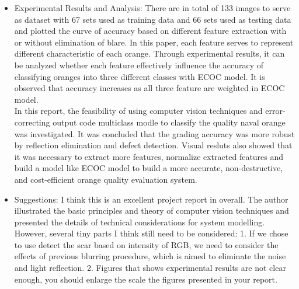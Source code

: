 \documentclass[letterpaper]{article}
\begin{document}
\begin{itemize}
	\item Experimental Results and Analysis: There are in total of 133 images to serve as dataset with 67 sets used as training data and 66 sets used as testing data and plotted the curve of accuracy based on different feature extraction with or without elimination of blare. In this paper, each feature serves to represent different characteristic of each orange. Through experimental results, it can be analyzed whether each feature effectively influence the accuracy of classifying oranges into three different classes with ECOC model. It is observed that accuracy increases as all three feature are weighted in ECOC model.\\
	
	In this report, the feasibility of using computer vision techniques and error-correcting output code multiclass modle to classify the quality naval orange was investigated. It was concluded that the grading accuracy was more robust by reflection elimination and defect detection. Visual resluts also showed that it was necessary to extract more features, normalize extracted features and build a model like ECOC model to build a more accurate, non-destructive, and cost-efficient orange quality evaluation system. 
	\item Suggestions: I think this is an excellent project report in overall. The author illustrated the basic principles and theory of computer vision techniques and presented the details of technical considerations for system modelling. However, several tiny parts I think still need to be considered: 1. If we chose to use detect the scar based on intensity of RGB, we need to consider the effects of previous blurring procedure, which is aimed to eliminate the noise and light reflection. 2. Figures that shows experimental results are not clear enough, you should enlarge the scale the figures presented in your report.
\end{itemize}

\clearpage
\end{document}
